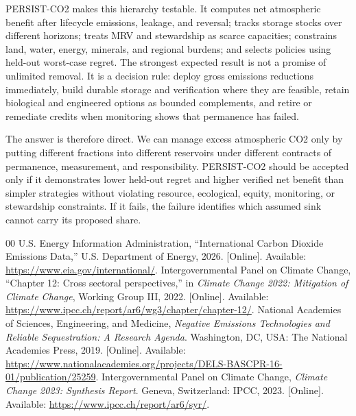 \documentclass[conference]{IEEEtran}
\begin{document}
PERSIST-CO2 makes this hierarchy testable. It computes net atmospheric benefit after lifecycle emissions, leakage, and reversal; tracks storage stocks over different horizons; treats MRV and stewardship as scarce capacities; constrains land, water, energy, minerals, and regional burdens; and selects policies using held-out worst-case regret. The strongest expected result is not a promise of unlimited removal. It is a decision rule: deploy gross emissions reductions immediately, build durable storage and verification where they are feasible, retain biological and engineered options as bounded complements, and retire or remediate credits when monitoring shows that permanence has failed.

The answer is therefore direct. We can manage excess atmospheric CO2 only by putting different fractions into different reservoirs under different contracts of permanence, measurement, and responsibility. PERSIST-CO2 should be accepted only if it demonstrates lower held-out regret and higher verified net benefit than simpler strategies without violating resource, ecological, equity, monitoring, or stewardship constraints. If it fails, the failure identifies which assumed sink cannot carry its proposed share.

\begin{thebibliography}{00}
 U.S. Energy Information Administration, ``International Carbon Dioxide Emissions Data,'' U.S. Department of Energy, 2026. [Online]. Available: \url{https://www.eia.gov/international/}.
 Intergovernmental Panel on Climate Change, ``Chapter 12: Cross sectoral perspectives,'' in \textit{Climate Change 2022: Mitigation of Climate Change}, Working Group III, 2022. [Online]. Available: \url{https://www.ipcc.ch/report/ar6/wg3/chapter/chapter-12/}.
 National Academies of Sciences, Engineering, and Medicine, \textit{Negative Emissions Technologies and Reliable Sequestration: A Research Agenda}. Washington, DC, USA: The National Academies Press, 2019. [Online]. Available: \url{https://www.nationalacademies.org/projects/DELS-BASCPR-16-01/publication/25259}.
 Intergovernmental Panel on Climate Change, \textit{Climate Change 2023: Synthesis Report}. Geneva, Switzerland: IPCC, 2023. [Online]. Available: \url{https://www.ipcc.ch/report/ar6/syr/}.
\end{thebibliography}
\end{document}
